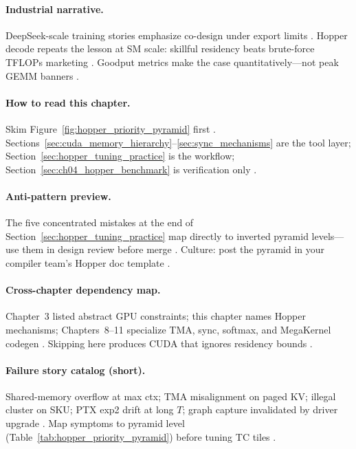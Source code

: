 \paragraph{Industrial narrative.}
DeepSeek-scale training stories emphasize co-design under export limits \citep{liu2024deepseekv3,patel2025llminference}.
Hopper decode repeats the lesson at SM scale: skillful residency beats brute-force TFLOPs marketing \citep{taxbreak2026,memoryfloor2026,dao2022flashattention}.
Goodput metrics make the case quantitatively---not peak GEMM banners \citep{taxbreak2026,dlbook}.

\paragraph{How to read this chapter.}
Skim Figure~\ref{fig:hopper_priority_pyramid} first \citep{patel2025llminference}.
Sections~\ref{sec:cuda_memory_hierarchy}--\ref{sec:sync_mechanisms} are the tool layer; Section~\ref{sec:hopper_tuning_practice} is the workflow; Section~\ref{sec:ch04_hopper_benchmark} is verification only \citep{yirage2026,taxbreak2026}.

\paragraph{Anti-pattern preview.}
The five concentrated mistakes at the end of Section~\ref{sec:hopper_tuning_practice} map directly to inverted pyramid levels---use them in design review before merge \citep{patel2025llminference,memoryfloor2026,taxbreak2026}.
Culture: post the pyramid in your compiler team's Hopper doc template \citep{yirage2026}.

\paragraph{Cross-chapter dependency map.}
Chapter~3 listed abstract GPU constraints; this chapter names Hopper mechanisms; Chapters~8--11 specialize TMA, sync, softmax, and MegaKernel codegen \citep{semianalysis2024tma,dao2022flashattention,dao2023flashdecoding,yirage2026}.
Skipping here produces CUDA that ignores residency bounds \citep{taxbreak2026,memoryfloor2026}.

\paragraph{Failure story catalog (short).}
Shared-memory overflow at max ctx; TMA misalignment on paged KV; illegal cluster on SKU; PTX exp2 drift at long $T$; graph capture invalidated by driver upgrade \citep{yirage2026,nvidia2024cudagraphs,dao2023flashdecoding,patel2025llminference}.
Map symptoms to pyramid level (Table~\ref{tab:hopper_priority_pyramid}) before tuning TC tiles \citep{memoryfloor2026,taxbreak2026}.

